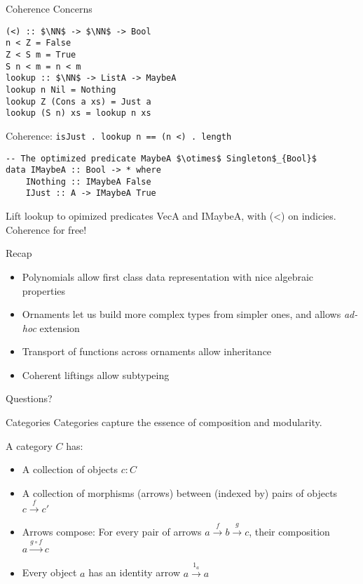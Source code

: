 \documentclass{beamer}
\newcommand{\NN}{\mathbb{N}}
\begin{document}
\begin{frame}[fragile]{Coherence Concerns}

\begin{lstlisting}
(<) :: $\NN$ -> $\NN$ -> Bool
n < Z = False
Z < S m = True
S n < m = n < m
lookup :: $\NN$ -> ListA -> MaybeA
lookup n Nil = Nothing
lookup Z (Cons a xs) = Just a
lookup (S n) xs = lookup n xs
\end{lstlisting}
\pause
Coherence: \lstinline+isJust . lookup n == (n <) . length+
\pause
\begin{lstlisting}
-- The optimized predicate MaybeA $\otimes$ Singleton$_{Bool}$
data IMaybeA :: Bool -> * where
    INothing :: IMaybeA False
    IJust :: A -> IMaybeA True
\end{lstlisting}

Lift lookup to opimized predicates VecA and IMaybeA, with (<) on indicies. Coherence for free!
\end{frame}
\begin{frame}{Recap}
\begin{itemize}
\item Polynomials allow first class data representation with nice algebraic properties
\item Ornaments let us build more complex types from simpler ones, and allows \emph{ad-hoc} extension
\item Transport of functions across ornaments allow inheritance
\item Coherent liftings allow subtypeing
\end{itemize}

\end{frame}
\begin{frame}
\begin{center}
\Huge Questions?
\end{center}

\end{frame}
\begin{frame}{Categories}
Categories capture the essence of composition and modularity.
\pause
\begin{definition}[Category]
A category $C$ has:
\begin{itemize}
\item A collection of objects $c : C$
\item A collection of  morphisms (arrows) between (indexed by) pairs of objects $c \xrightarrow{f} c'$
\item Arrows compose: For every pair of arrows $a \xrightarrow{f} b \xrightarrow{g} c$, their composition $a \xrightarrow{g \circ f} c$
\item Every object $a$ has an identity arrow $a \xrightarrow{1_a} a$
\end{itemize}
\end{definition}
\end{frame}
\end{document}
